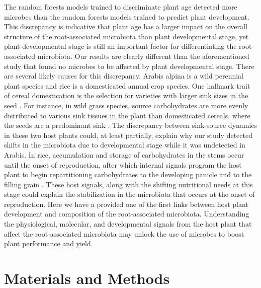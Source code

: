 The random forests models trained to discriminate plant age detected more microbes than the random forests models trained to predict plant development. This discrepancy is indicative that plant age has a larger impact on the overall structure of the root-associated microbiota than plant developmental stage, yet plant developmental stage is still an important factor for differentiating the root-associated microbiota. Our results are clearly different than the aforementioned study that found no microbes to be affected by plant developmental stage. There are several likely causes for this discrepancy. Arabis alpina is a wild perennial plant species and rice is a domesticated annual crop species. One hallmark trait of cereal domestication is the selection for varieties with larger sink sizes in the seed \cite{Ishimaru2013}. For instance, in wild grass species, source carbohydrates are more evenly distributed to various sink tissues in the plant than domesticated cereals, where the seeds are a predominant sink \cite{Shomura2008,Ishimaru2013}. The discrepancy between sink-source dynamics in these two host plants could, at least partially, explain why our study detected shifts in the microbiota due to developmental stage while it was undetected in Arabis. In rice, accumulation and storage of carbohydrates in the stems occur until the onset of reproduction, after which internal signals program the host plant to begin repartitioning carbohydrates to the developing panicle and to the filling grain \cite{Slewinski2012,Scofield2009}. These host signals, along with the shifting nutritional needs at this stage could explain the stabilization in the microbiota that occurs at the onset of reproduction. Here we have a provided one of the first links between host plant development and composition of the root-associated microbiota. Understanding the physiological, molecular, and developmental signals from the host plant that affect the root-associated microbiota may unlock the use of microbes to boost plant performance and yield.
	
\section{Materials and Methods}
%

